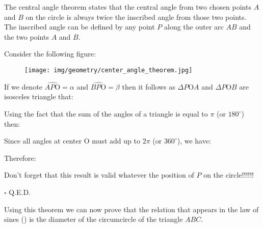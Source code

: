 	\begin{theorem}
	The central angle theorem states that the central angle from two chosen points $A$ and $B$ on the circle is always twice the inscribed angle from those two points. The inscribed angle can be defined by any point $P$ along the outer arc $AB$ and the two points $A$ and $B$.
	\end{theorem}

	\begin{dem}
	Consider the following figure:
	\begin{figure}[H]
		\centering
		\texttt{[image: img/geometry/center\_angle\_theorem.jpg]}
	\end{figure}
	If we denote $\widehat{AP\text{O}}=\alpha$ and $\widehat{BP\text{O}}=\beta$ then it follows as $\Delta P\text{O}A$ and $\Delta P\text{O}B$ are isosceles triangle that:
	
	Using the fact that the sum of the angles of a triangle is equal to $\pi$ (or $180^\circ$) then:
	
	Since all angles at center O must add up to $2\pi$ (or $360^\circ$), we have:
	
	Therefore:
	
	Don't forget that this result is valid whatever the position of $P$ on the circle!!!!!!
	\begin{flushright}
		$\square$  Q.E.D.
	\end{flushright}
	\end{dem}
	Using this theorem we can now prove that the relation that appears in the law of sines () is the diameter of the circumcircle of the triangle $ABC$.

